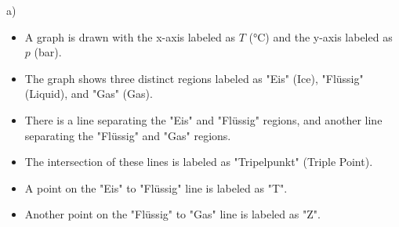 a)

\begin{itemize}
    \item A graph is drawn with the x-axis labeled as $T$ (°C) and the y-axis labeled as $p$ (bar).
    \item The graph shows three distinct regions labeled as "Eis" (Ice), "Flüssig" (Liquid), and "Gas" (Gas).
    \item There is a line separating the "Eis" and "Flüssig" regions, and another line separating the "Flüssig" and "Gas" regions.
    \item The intersection of these lines is labeled as "Tripelpunkt" (Triple Point).
    \item A point on the "Eis" to "Flüssig" line is labeled as "T".
    \item Another point on the "Flüssig" to "Gas" line is labeled as "Z".
\end{itemize}